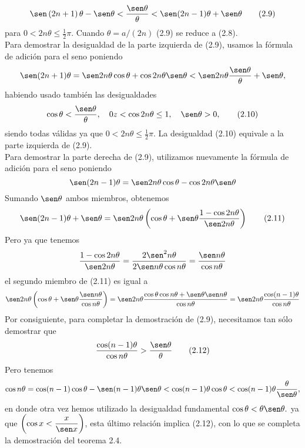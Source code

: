 \begin{teo}
    $$\sen\left(2n+1\right)\theta -\sen \theta < \dfrac{\sen \theta}{\theta} < \sen(2n-1)\theta +\sen \theta \qquad \mbox{(2.9)}$$
    para $0<2n\theta\leq \frac{1}{2}\pi$. Cuando $\theta = a/(2n)$ (2.9) se reduce a (2.8).\\
    Para demostrar la desigualdad de la parte izquierda de (2.9), usamos la fórmula de adición para el seno poniendo $$\sen(2n+1)\theta = \sen 2n\theta \cos \theta + \cos 2n\theta \sen \theta < \sen 2n\theta \dfrac{\sen \theta}{\theta} + \sen \theta,$$
    habiendo usado también las desigualdades $$\cos \theta < \dfrac{\sen \theta}{\theta}, \quad 0z<\cos 2n\theta \leq 1, \quad \sen \theta > 0, \qquad \mbox{(2.10)}$$
    siendo todas válidas ya que $0<2n\theta \leq \frac{1}{2}\pi$. La desigualdad (2.10) equivale a la parte izquierda de (2.9).\\
    Para demostrar la parte derecha de (2.9), utilizamos nuevamente la fórmula de adición para el seno poniendo $$\sen(2n-1)\theta = \sen 2n\theta \cos \theta - \cos 2n\theta \sen \theta$$
    Sumando $\sen \theta$ ambos miembros, obtenemos $$\sen(2n-1)\theta + \sen \theta = \sen 2n\theta \left(\cos \theta +\sen \theta \dfrac{1-\cos 2n\theta}{\sen 2n\theta}\right) \qquad \mbox{(2.11)}$$
    Pero ya que tenemos $$\dfrac{1-\cos 2n\theta}{\sen2n\theta}=\dfrac{2\sen^2n\theta}{2\sen n\theta \cos n \theta}=\dfrac{\sen n\theta}{\cos n \theta}$$
    el segundo miembro de (2.11) es igual a $$\sen 2n\theta \left(\cos \theta + \sen \theta \dfrac{\sen n \theta}{\cos n\theta}\right) = \sen 2 n\theta \dfrac{\cos \theta \cos n\theta + \sen \theta \sen n \theta}{\cos n \theta} = \sen 2n\theta \dfrac{\cos (n-1) \theta}{\cos n \theta}$$
    Por consiguiente, para completar la demostración de (2.9), necesitamos tan sólo demostrar que 
    $$\dfrac{\cos(n-1)\theta}{\cos n\theta}>\dfrac{\sen \theta}{\theta} \qquad \mbox{(2.12)}$$
    Pero tenemos $$\cos n\theta = \cos(n-1)\cos \theta - \sen(n-1)\theta \sen \theta < \cos(n-1)\theta \cos \theta < \cos(n-1)\theta \dfrac{\theta}{\sen \theta},$$
    en donde otra vez hemos utilizado la desigualdad fundamental $\cos \theta < \theta\sen \theta.$ ya que $\left(\cos x < \dfrac{x}{\sen x}\right)$, esta último relación implica (2.12), con lo que se completa la demostración del teorema 2.4.\\\\

\end{teo}

